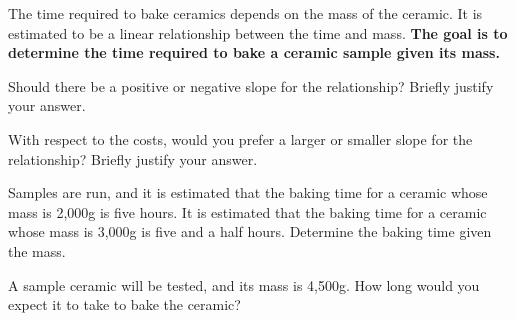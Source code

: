 \begin{problem}

\item The time required to bake ceramics depends on the mass of the
  ceramic. It is estimated to be a linear relationship between the
  time and mass. \textbf{The goal is to determine the time required to
    bake a ceramic sample given its mass.}
  \begin{subproblem}
    \item Should there be a positive or negative slope for the
      relationship? Briefly justify your answer.
      \vspace{2em}

    \item With respect to the costs, would you prefer a larger or
      smaller slope for the relationship? Briefly justify your answer.
      \vspace{2em}

    \item Samples are run, and it is estimated that the baking time
      for a ceramic whose mass is 2,000g is five hours. It is
      estimated that the baking time for a ceramic whose mass is
      3,000g is five and a half hours. Determine the baking time given
      the mass.
      \vfill
      \vfill

    \item A sample ceramic will be tested, and its mass is
      4,500g. How long would you expect it to take to bake the
      ceramic?
      \vfill

  \end{subproblem}

  \clearpage


\end{problem}
